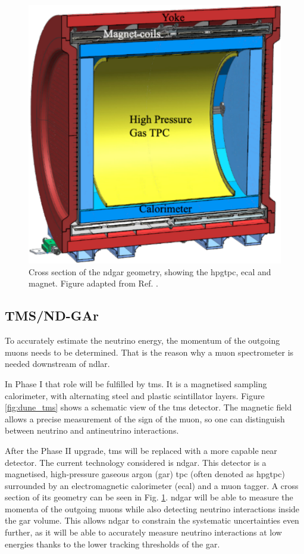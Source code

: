 \begin{figure}[t]
	\centering
	\includegraphics[width=0.45\linewidth]{Images/DUNE/ND/nd_gar}
	\caption[Cross section of the \gls{ndgar} geometry, showing the \gls{hpgtpc}, \gls{ecal} and magnet.]{Cross section of the \gls{ndgar} geometry, showing the \gls{hpgtpc}, \gls{ecal} and magnet. Figure adapted from Ref. \cite{DUNE2024Phase2}.}
	\label{fig:dune_nd_gar}
\end{figure}

\subsection{TMS/ND-GAr}

To accurately estimate the neutrino energy, the momentum of the outgoing muons needs to be determined. That is the reason why a muon spectrometer is needed downstream of \gls{ndlar}.

In Phase I that role will be fulfilled by \gls{tms}. It is a magnetised sampling calorimeter, with alternating steel and plastic scintillator layers. Figure \ref{fig:dune_tms} shows a schematic view of the \gls{tms} detector. The magnetic field allows a precise measurement of the sign of the muon, so one can distinguish between neutrino and antineutrino interactions.

After the Phase II upgrade, \gls{tms} will be replaced with a more capable near detector. The current technology considered is \gls{ndgar}. This detector is a magnetised, high-pressure gaseous argon (\gls{gar}) \gls{tpc} (often denoted as \gls{hpgtpc}) surrounded by an electromagnetic calorimeter (\gls{ecal}) and a muon tagger. A cross section of its geometry can be seen in Fig. \ref{fig:dune_nd_gar}. \gls{ndgar} will be able to measure the momenta of the outgoing muons while also detecting neutrino interactions inside the \gls{gar} volume. This allows \gls{ndgar} to constrain the systematic uncertainties even further, as it will be able to accurately measure neutrino interactions at low energies thanks to the lower tracking thresholds of the \gls{gar}.

